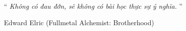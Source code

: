 \documentclass[
12pt,
oneside,
english,
doublespacing,
nolistspacing,
liststotoc,
parskip,
headsepline,
chapterinoneline,
]{HUSdissertation}
\author{Lại Huy Hoàng \\ Nguyễn Trọng Tùng \\ Nguyễn Bá Tiến Phát \\ Tô Quang Hân}
\begin{document}
	
	\lstset{style=codeC}	%
	
	\frontmatter 			%
	
	\pagestyle{plain} 
	
	
	
	
	
	
	
	
	
	\vspace*{0.2\textheight}
	
	\noindent\enquote{\itshape 
		Không có đau đớn, sẽ không có bài học thực sự ý nghĩa.
	}\bigbreak
	
	\hfill Edward Elric (Fullmetal Alchemist: Brotherhood)
	
	
	
\end{document}
